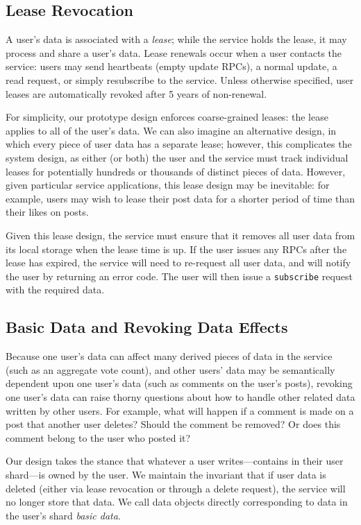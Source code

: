 \documentclass[letterpaper,twocolumn,10pt]{article}
\begin{document}
\subsection{Lease Revocation}
\label{sec:leases}
A user's data is associated with a \emph{lease}; while the service holds the lease, it may process and share a user's data. 
Lease renewals occur when a user contacts the service: users may send heartbeats (empty update RPCs), a normal update, a read request,
or simply resubscribe to the service.
Unless otherwise specified, user leases are automatically revoked after 5 years of non-renewal.  

For simplicity, our prototype design enforces coarse-grained leases: the lease applies to all of the user's data.
We can also imagine an alternative design, in which every piece of user data has a separate lease; however, this complicates the system design, 
as either (or both) the user and the service must track individual leases for potentially hundreds or thousands of distinct pieces
of data. However, given particular service applications, this lease design may be inevitable: for example, users may wish to 
lease their post data for a shorter period of time than their likes on posts.

Given this lease design, the service must ensure that it removes all user data 
from its local storage when the lease time is up.
If the user issues any RPCs after the lease has expired, 
the service will need to re-request all user data,
and will notify the user by returning an error code.
The user will then issue a \texttt{subscribe} request with the required data.

\subsection{Basic Data and Revoking Data Effects}
Because one user's data can affect many derived pieces of data in the service (such as an aggregate vote count), and other users' data may be semantically dependent upon one user's data (such as comments on the user's posts),
revoking one user's data can raise thorny questions about how to handle other related data written by other users.
For example, what will happen if a comment is made on a post that another user deletes? Should the comment be removed? Or does this comment belong to the user who posted it? 

Our design takes the stance that whatever a user writes---contains in their user shard---is owned by the user.
We maintain the invariant that if user data is deleted (either via lease revocation or through a delete request), the service
will no longer store that data. We call data objects directly corresponding to data in the user's shard \emph{basic data}.
\end{document}
